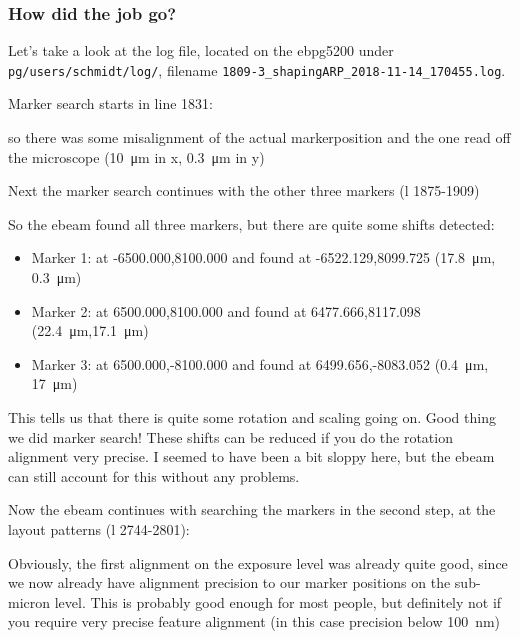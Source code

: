 \subsubsection{How did the job go?}
Let's take a look at the log file, located on the ebpg5200 under \texttt{pg/users/schmidt/log/}, filename \texttt{1809-3\_shapingARP\_2018-11-14\_170455.log}.

Marker search starts in line 1831:



so there was some misalignment of the actual markerposition and the one read off the microscope (\SI{10}{\micro\meter} in x, \SI{0.3}{\micro\meter} in y)

Next the marker search continues with the other three markers (l 1875-1909)




So the ebeam found all three markers, but there are quite some shifts detected:
\begin{itemize}
	\item Marker 1: at -6500.000,8100.000 and found at -6522.129,8099.725 (\SI{17.8}{\micro\meter}, \SI{0.3}{\micro\meter})
	\item Marker 2: at 6500.000,8100.000 and found at 6477.666,8117.098 (\SI{22.4}{\micro\meter},\SI{17.1}{\micro\meter})
	\item Marker 3: at 6500.000,-8100.000 and found at 6499.656,-8083.052 (\SI{0.4}{\micro\meter}, \SI{17}{\micro\meter})
\end{itemize}
This tells us that there is quite some rotation and scaling going on. Good thing we did marker search! These shifts can be reduced if you do the rotation alignment very precise. I seemed to have been a bit sloppy here, but the ebeam can still account for this without any problems.

Now the ebeam continues with searching the markers in the second step, at the layout patterns (l 2744-2801):



Obviously, the first alignment on the exposure level was already quite good, since we now already have alignment precision to our marker positions on the sub-micron level. This is probably good enough for most people, but definitely not if you require very precise feature alignment (in this case precision below \SI{100}{\nano\meter})

